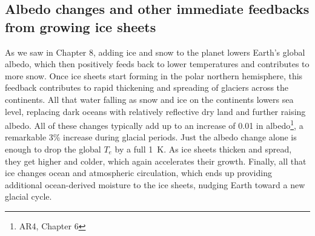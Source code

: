 \subsection{Albedo changes and other immediate feedbacks from growing ice sheets}
As we saw in Chapter 8, adding ice and snow to the planet lowers Earth's global albedo, which then positively feeds back to lower temperatures and contributes to more snow. Once ice sheets start forming in the polar northern hemisphere, this feedback contributes to rapid thickening and spreading of glaciers across the continents. All that water falling as snow and ice on the continents lowers sea level, replacing dark oceans with relatively reflective dry land and further raising albedo. All of these changes typically add up to an increase of 0.01 in albedo\footnote{AR4, Chapter 6}, a remarkable 3\% increase during glacial periods. Just the albedo change alone is enough to drop the global $T_e$ by a full \SI{1}{K}. As ice sheets thicken and spread, they get higher and colder, which again accelerates their growth. Finally, all that ice changes ocean and atmospheric circulation, which ends up providing additional ocean-derived moisture to the ice sheets, nudging Earth toward a new glacial cycle. \\
